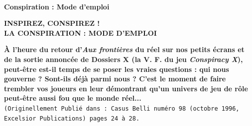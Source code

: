 \documentclass[11pt,twoside,a4paper]{article}
\title{\txtTITLE}
\date{ --- }
\def\txtTITLE{Conspiration : Mode d'emploi} %
\begin{document}
\setlength\parindent{0pt} %

~\\

\vfill

\begin{center}
	\textbf{\Huge \txtTITLE}
\end{center}

\vfill


\begin{center}
	\textbf{\Huge INSPIREZ, CONSPIREZ !~\\ LA CONSPIRATION : MODE D'EMPLOI}
\end{center}

\textbf{\scriptsize {\`A} l'heure du retour d'\emph{Aux fronti{\`e}res} du r{\'e}el sur nos petits {\'e}crans et de la sortie annonc{\'e}e de Dossiers X (la V. F. du jeu \emph{Conspiracy X}), peut-{\^e}tre est-il temps de se poser les vraies questions : qui nous gouverne ? Sont-ils d{\'e}j{\`a} parmi nous ? C'est le moment de faire trembler vos joueurs en leur d{\'e}montrant qu'un univers de jeu de r{\^o}le peut-{\^e}tre aussi fou que le monde r{\'e}el... }~\\
\texttt{\scriptsize (Originellement Publi{\'e} dans : Casus Belli num{\'e}ro 98 (octobre 1996, Excelsior Publications) pages 24 {\`a} 28. }~\\ 

\vfill

\clearpage
\end{document}
